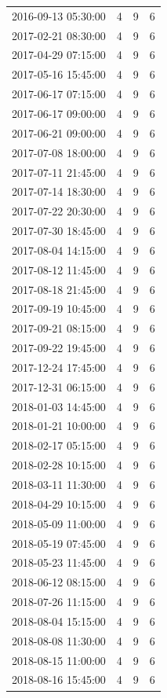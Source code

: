 \begin{tabular}{lrrr}
2016-09-13 05:30:00 & 4 & 9 & 6 \\
2017-02-21 08:30:00 & 4 & 9 & 6 \\
2017-04-29 07:15:00 & 4 & 9 & 6 \\
2017-05-16 15:45:00 & 4 & 9 & 6 \\
2017-06-17 07:15:00 & 4 & 9 & 6 \\
2017-06-17 09:00:00 & 4 & 9 & 6 \\
2017-06-21 09:00:00 & 4 & 9 & 6 \\
2017-07-08 18:00:00 & 4 & 9 & 6 \\
2017-07-11 21:45:00 & 4 & 9 & 6 \\
2017-07-14 18:30:00 & 4 & 9 & 6 \\
2017-07-22 20:30:00 & 4 & 9 & 6 \\
2017-07-30 18:45:00 & 4 & 9 & 6 \\
2017-08-04 14:15:00 & 4 & 9 & 6 \\
2017-08-12 11:45:00 & 4 & 9 & 6 \\
2017-08-18 21:45:00 & 4 & 9 & 6 \\
2017-09-19 10:45:00 & 4 & 9 & 6 \\
2017-09-21 08:15:00 & 4 & 9 & 6 \\
2017-09-22 19:45:00 & 4 & 9 & 6 \\
2017-12-24 17:45:00 & 4 & 9 & 6 \\
2017-12-31 06:15:00 & 4 & 9 & 6 \\
2018-01-03 14:45:00 & 4 & 9 & 6 \\
2018-01-21 10:00:00 & 4 & 9 & 6 \\
2018-02-17 05:15:00 & 4 & 9 & 6 \\
2018-02-28 10:15:00 & 4 & 9 & 6 \\
2018-03-11 11:30:00 & 4 & 9 & 6 \\
2018-04-29 10:15:00 & 4 & 9 & 6 \\
2018-05-09 11:00:00 & 4 & 9 & 6 \\
2018-05-19 07:45:00 & 4 & 9 & 6 \\
2018-05-23 11:45:00 & 4 & 9 & 6 \\
2018-06-12 08:15:00 & 4 & 9 & 6 \\
2018-07-26 11:15:00 & 4 & 9 & 6 \\
2018-08-04 15:15:00 & 4 & 9 & 6 \\
2018-08-08 11:30:00 & 4 & 9 & 6 \\
2018-08-15 11:00:00 & 4 & 9 & 6 \\
2018-08-16 15:45:00 & 4 & 9 & 6 \\

\end{tabular}
